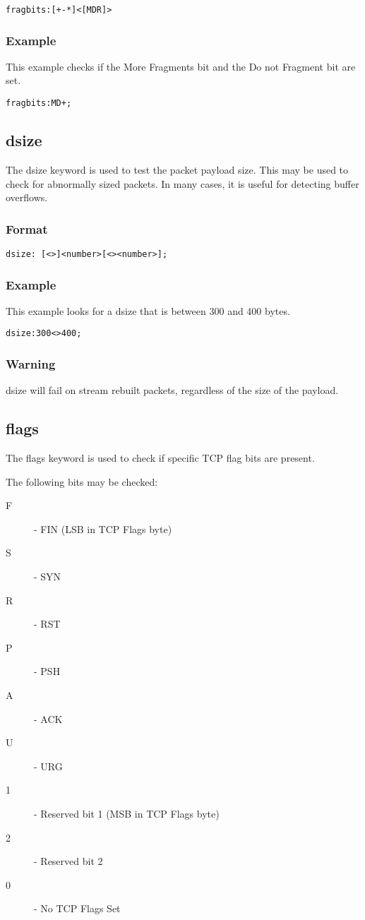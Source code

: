\documentclass[english]{report}
\begin{document}
\begin{verbatim}
fragbits:[+-*]<[MDR]>
\end{verbatim}

\subsubsection{Example}

This example checks if the More Fragments bit and the Do not Fragment bit are
set.
\begin{verbatim}
fragbits:MD+;
\end{verbatim}

\subsection{dsize}

The dsize keyword is used to test the packet payload size.  This may be used to check for abnormally sized packets.  In many cases, it is useful for detecting buffer overflows.

\subsubsection{Format}
\begin{verbatim}
dsize: [<>]<number>[<><number>];
\end{verbatim}

\subsubsection{Example}
This example looks for a dsize that is between 300 and 400 bytes.
\begin{verbatim}
dsize:300<>400;
\end{verbatim}

\subsubsection{Warning}
dsize will fail on stream rebuilt packets, regardless of the size of the
payload.

\subsection{flags}

The flags keyword is used to check if specific TCP flag bits are present.

The following bits may be checked:
\begin{description}
\item [F] - FIN (LSB in TCP Flags byte)
\item [S] - SYN 
\item [R] - RST 
\item [P] - PSH 
\item [A] - ACK 
\item [U] - URG 
\item [1] - Reserved bit 1 (MSB in TCP Flags byte)
\item [2] - Reserved bit 2 
\item [0] - No TCP Flags Set
\end{description}
\end{document}
